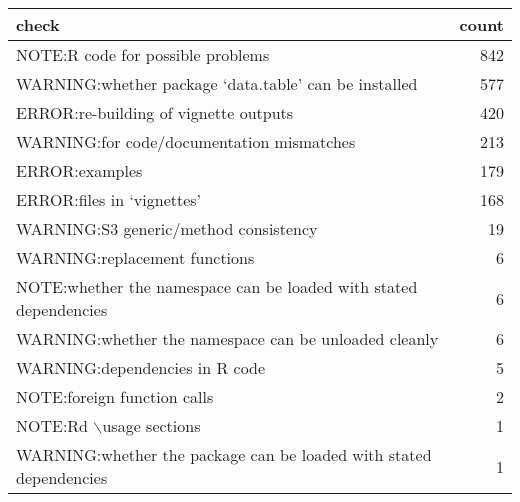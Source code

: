 \begin{tabular}{lr}
  \hline
check & count \\ 
  \hline
NOTE:R code for possible problems & 842 \\ 
  WARNING:whether package ‘data.table’ can be installed & 577 \\ 
  ERROR:re-building of vignette outputs & 420 \\ 
  WARNING:for code/documentation mismatches & 213 \\ 
  ERROR:examples & 179 \\ 
  ERROR:files in ‘vignettes’ & 168 \\ 
  WARNING:S3 generic/method consistency & 19 \\ 
  WARNING:replacement functions &  6 \\ 
  NOTE:whether the namespace can be loaded with stated dependencies &  6 \\ 
  WARNING:whether the namespace can be unloaded cleanly &  6 \\ 
  WARNING:dependencies in R code &  5 \\ 
  NOTE:foreign function calls &  2 \\ 
  NOTE:Rd $\backslash$usage sections &  1 \\ 
  WARNING:whether the package can be loaded with stated dependencies &  1 \\ 
   \hline
\end{tabular}
